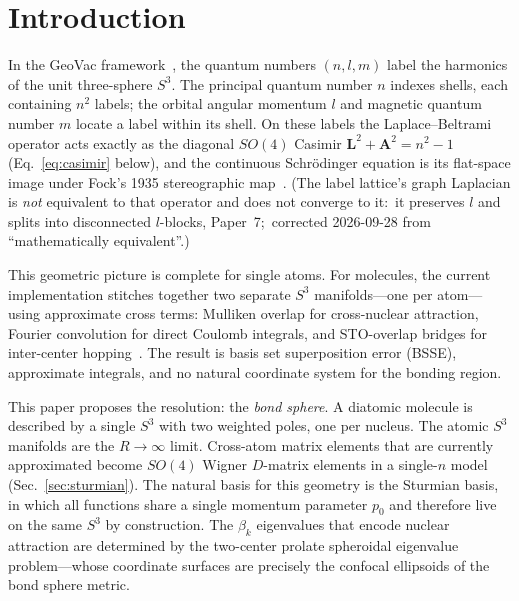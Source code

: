 \documentclass[aps,pra,twocolumn,superscriptaddress,longbibliography]{revtex4-2}
\theoremstyle{remark}
\theoremstyle{plain}
\begin{document}
\maketitle


\section{Introduction}
\label{sec:intro}

In the GeoVac framework~\cite{loutey_paper0,loutey_paper1,loutey_paper7},
the quantum numbers $(n, l, m)$ label the harmonics of the unit
three-sphere $S^3$.  The principal quantum number $n$ indexes shells, each
containing $n^2$ labels; the orbital angular momentum $l$ and magnetic
quantum number $m$ locate a label within its shell.  On these labels the
Laplace--Beltrami operator acts exactly as the diagonal $SO(4)$ Casimir
$\mathbf{L}^2 + \mathbf{A}^2 = n^2 - 1$ (Eq.~\eqref{eq:casimir} below), and
the continuous Schr\"odinger equation is its flat-space image under Fock's
1935 stereographic map~\cite{Fock1935,loutey_paper7}.  (The label
lattice's graph Laplacian is \emph{not} equivalent to that operator and
does not converge to it:\ it preserves $l$ and splits into disconnected
$l$-blocks, Paper~7;\ corrected 2026-09-28 from ``mathematically
equivalent''.)

This geometric picture is complete for single atoms.  For molecules, the
current implementation stitches together two separate $S^3$
manifolds---one per atom---using approximate cross terms: Mulliken overlap
for cross-nuclear attraction, Fourier convolution for direct Coulomb
integrals, and STO-overlap bridges for inter-center
hopping~\cite{loutey_fci}.  The result is basis set superposition error
(BSSE), approximate integrals, and no natural coordinate system for the
bonding region.

This paper proposes the resolution: the \emph{bond sphere}.  A diatomic
molecule is described by a single $S^3$ with two weighted poles, one per
nucleus.  The atomic $S^3$ manifolds are the $R \to \infty$ limit.
Cross-atom matrix elements that are currently approximated become
$SO(4)$ Wigner $D$-matrix elements in a single-$n$ model
(Sec.~\ref{sec:sturmian}).  The natural basis for this geometry
is the Sturmian basis, in which all functions share a single momentum
parameter $p_0$ and therefore live on the same $S^3$ by construction.
The $\beta_k$ eigenvalues that encode nuclear attraction are determined
by the two-center prolate spheroidal eigenvalue problem---whose coordinate
surfaces are precisely the confocal ellipsoids of the bond sphere metric.
\end{document}
